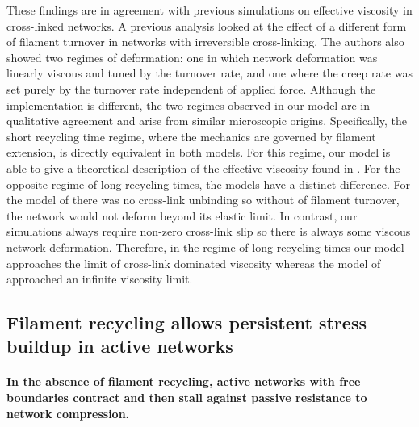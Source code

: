 \documentclass[10pt,letterpaper]{article}
\begin{document}
These findings are in agreement with previous simulations on effective viscosity in cross-linked networks. A previous analysis \cite{Kim2014526} looked at the effect of a different form of filament turnover in networks with irreversible cross-linking. The authors also showed two regimes of deformation: one in which network deformation was linearly viscous and tuned by the turnover rate, and one where the creep rate was set purely by the turnover rate independent of applied force.  Although the implementation is different, the two regimes observed in our model are in qualitative agreement and arise from similar microscopic origins. Specifically, the short recycling time regime, where the mechanics are governed by filament extension, is directly equivalent in both models.  For this regime, our model is able to give a theoretical description of the effective viscosity found in \cite{Kim2014526}.  For the opposite regime of long recycling times, the models have a distinct difference.  For the model of \cite{Kim2014526} there was no cross-link unbinding so without of filament turnover, the network would not deform beyond its elastic limit.  In contrast, our simulations always require non-zero cross-link slip so there is always some viscous network deformation.  Therefore, in the regime of long recycling times our model approaches the limit of cross-link dominated viscosity whereas the model of \cite{Kim2014526} approached an infinite viscosity limit.






\subsection*{Filament recycling allows persistent stress buildup in active networks}

\paragraph{In the absence of filament recycling, active networks with free boundaries contract and then stall against passive resistance to network compression.}
\end{document}
